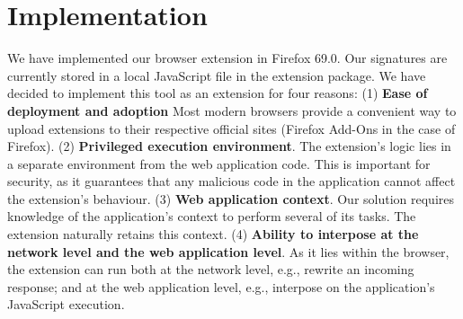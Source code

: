 \section{Implementation} \label{implementation}

We have implemented our browser extension in Firefox 69.0. Our signatures are currently stored in a local JavaScript file in the extension package. We have decided to implement this tool as an extension for four reasons:
(1) \textbf{Ease of deployment and adoption} Most modern browsers provide a convenient way to upload extensions to their respective official sites (Firefox Add-Ons in the case of Firefox). %
(2) \textbf{Privileged execution environment}. The extension's logic lies in a separate environment from the web application code. This is important for security, as it guarantees that any malicious code in the application cannot affect the extension's behaviour. %
(3) \textbf{Web application context}. Our solution requires knowledge of the application's context to perform several of its tasks. %
The extension naturally retains this context.
(4) \textbf{Ability to interpose at the network level and the web application level}. As it lies within the browser, the extension can run both at the network level, e.g., rewrite an incoming response; and at the web application level, e.g., interpose on the application's JavaScript execution. %

